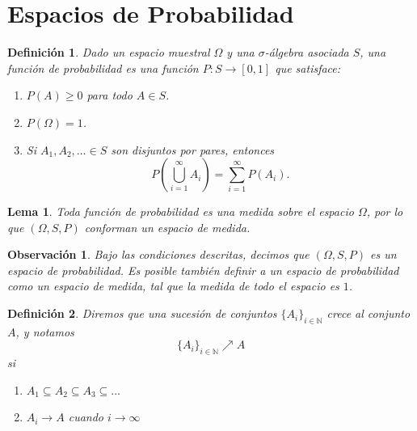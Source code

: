 \documentclass{report}
\newtheorem{lem}{Lema}[section]
\newtheorem{dfn}{Definición}[section]
\newtheorem{obs}{Observación}[section]
\begin{document}
\section{Espacios de Probabilidad}

\begin{dfn}
Dado un espacio muestral \( \Omega \) y una $\sigma$-álgebra asociada \( S \), 
una \emph{función de probabilidad} es una función \( P \colon S \to [0,1] \) que satisface:

\begin{enumerate}
    \item \( P(A) \geq 0 \) para todo \( A \in S \).
    \item \( P(\Omega) = 1 \).
    \item Si \( A_1, A_2, \dots \in S \) son disjuntos por pares, entonces
    \[
        P\left( \bigcup_{i=1}^{\infty} A_i \right) = \sum_{i=1}^{\infty} P(A_i).
    \]
\end{enumerate}
\end{dfn}

\begin{lem}
    Toda función de probabilidad es una medida sobre el espacio $\Omega$, por lo que $(\Omega, S, P)$ conforman un espacio de medida.
\end{lem}

\begin{obs}
    Bajo las condiciones descritas, decimos que $(\Omega, S, P)$ es un \emph{espacio de probabilidad}. Es posible también definir
    a un espacio de probabilidad como un espacio de medida, tal que la medida de todo el espacio es $1$.
\end{obs}

\begin{dfn}
Diremos que una sucesión de conjuntos $\{A_i\}_{i\in\mathbb{N}}$ \emph{crece} al conjunto $A$, y notamos
$$
\{A_i\}_{i\in\mathbb{N}}\nearrow A
$$
si
\begin{enumerate}
    \item $A_1 \subseteq A_2 \subseteq A_3 \subseteq \dots$
    \item $A_i \rightarrow A$ cuando $i\rightarrow \infty$
\end{enumerate}
\end{dfn}
\end{document}
